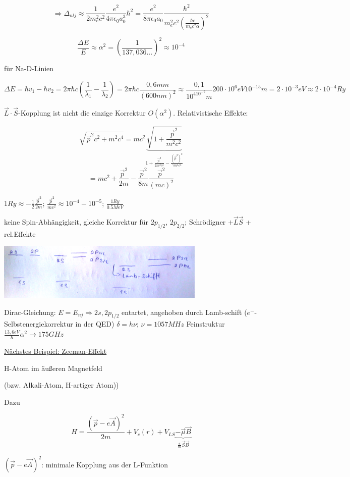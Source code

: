 \[\Rightarrow \Delta_{nlj} \approx \frac{1}{2m^2_e c^2} \frac{e^2}{4\pi \epsilon_0 a^3_0}\hbar^2 = \frac{e^2}{8\pi \epsilon_0 a_0}\frac{\hbar^2}{m^2_e c^2(\frac{\hbar c}{m_e c^2 \alpha})^2} \]

\[ \frac{\Delta E}{E}\approx \alpha^2 = (\frac{1}{137,036...})^2 \approx 10^{-4}\]

für Na-D-Linien

\[\Delta E = \hbar v_1-\hbar v_2 = 2\pi \hbar c(\frac{1}{\lambda_1}-\frac{1}{\lambda_2}) = 2\pi \hbar c \frac{0,6mm}{(600nm)^2} \approx \frac{0,1}{10^410^{-9}m}200\cdot 10^6 eV 10^{-15}m = 2\cdot 10^{-3}eV\approx 2\cdot 10^{-4}Ry\]

\(\vec L \cdot \vec S\)-Kopplung ist nicht die einzige Korrektur \(O(\alpha^2)\). Relativistische Effekte:

\[ \sqrt{\vec p^2 c^2+m^2c^4}= mc^2\underbrace{\sqrt{1+\frac{\vec p^2}{m^2c^2}}}_{1+\frac{\vec p^2}{2m^2c^2}-\frac{(\vec p^2)^2}{\gamma m^4 c^4}}\]
\[ = mc^2 + \frac{\vec p^2}{2m}-\frac{\vec p^2}{8m}\frac{\vec p^2}{(mc)^2}\]

\(1 Ry \approx -\frac{1}{2} \frac{\vec p^2}{2m}\); \(\frac{\vec p^2}{mc^2}\approx 10^{-4}-10^{-5}\); \(\frac{1Ry}{0.5 MeV}\)


keine Spin-Abhängigkeit, gleiche Korrektur für \(2p_{1/2}\), \(2p_{2/2}\); Schrödigner \(+\vec L \vec S\) + rel.Effekte

\includegraphics[width=0.75\textwidth]{kap03_03.png}

Dirac-Gleichung: \(E=E_{nj}\Rightarrow 2s,2p_{1/2}\) entartet, angehoben durch Lamb-schift (\(e^-\)-Selbstenergiekorrektur in der QED) \(\delta = h\nu\); \(\nu = 1057MHz\) Feinstruktur \(\frac{13,6eV}{\hbar}\alpha^2\rightarrow 175GHz\)

\underline{Nächstes Beispiel: Zeeman-Effekt}

H-Atom im äußeren Magnetfeld

(bzw. Alkali-Atom, H-artiger Atom))

Dazu

\[ H=\frac{(\vec p-e\vec A)^2}{2m}+V_c(r)+V_{LS}\underbrace{-\vec \mu\vec B}_{\frac{e}{m}\vec S\vec B}\]

\((\vec p-e\vec A)^2\): minimale Kopplung aus der L-Funktion

